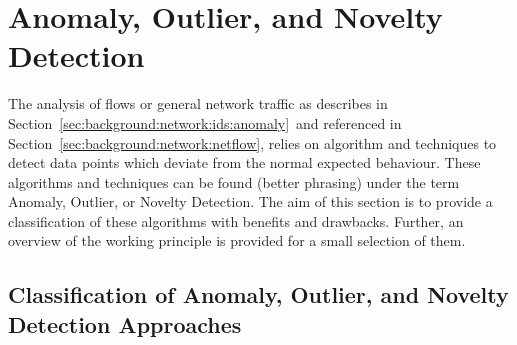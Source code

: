 \section{Anomaly, Outlier, and Novelty Detection}
\label{sec:background:network:novelty}

The analysis of flows or general network traffic as describes in Section~\ref{sec:background:network:ids:anomaly}~and referenced in Section~\ref{sec:background:network:netflow}, relies on algorithm and techniques to detect data points which deviate from the normal expected behaviour. These algorithms and techniques can be found \alert{(better phrasing)} under the term Anomaly, Outlier, or Novelty Detection.
The aim of this section is to provide a classification of these algorithms with benefits and drawbacks.
Further, an overview of the working principle is provided for a small selection of them.

\subsection{Classification of Anomaly, Outlier, and Novelty Detection Approaches}
\label{sec:background:network:novelty:class}

